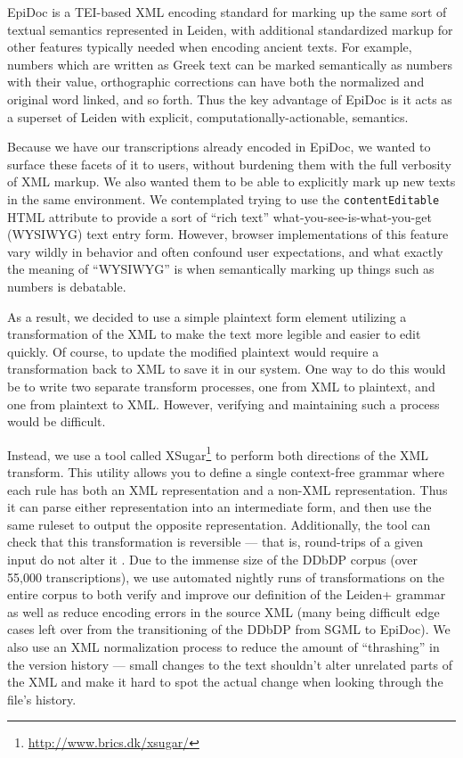 \documentclass[]{article}
\begin{document}
EpiDoc is a TEI-based XML encoding standard for marking up the same sort of textual semantics represented in Leiden, with additional standardized markup for other features typically needed when encoding ancient texts. For example, numbers which are written as Greek text can be marked semantically as numbers with their value, orthographic corrections can have both the normalized and original word linked, and so forth. Thus the key advantage of EpiDoc is it acts as a superset of Leiden with explicit, computationally-actionable, semantics.

Because we have our transcriptions already encoded in EpiDoc, we wanted to surface these facets of it to users, without burdening them with the full verbosity of XML markup. We also wanted them to be able to explicitly mark up new texts in the same environment. We contemplated trying to use the \texttt{contentEditable} HTML attribute to provide a sort of “rich text” what-you-see-is-what-you-get (WYSIWYG) text entry form. However, browser implementations of this feature vary wildly in behavior and often confound user expectations, and what exactly the meaning of “WYSIWYG” is when semantically marking up things such as numbers is debatable.

As a result, we decided to use a simple plaintext form element utilizing a transformation of the XML to make the text more legible and easier to edit quickly. Of course, to update the modified plaintext would require a transformation back to XML to save it in our system. One way to do this would be to write two separate transform processes, one from XML to plaintext, and one from plaintext to XML. However, verifying and maintaining such a process would be difficult.

Instead, we use a tool called XSugar\footnote{\url{http://www.brics.dk/xsugar/}} to perform both directions of the XML transform. This utility allows you to define a single context-free grammar where each rule has both an XML representation and a non-XML representation. Thus it can parse either representation into an intermediate form, and then use the same ruleset to output the opposite representation. Additionally, the tool can check that this transformation is reversible — that is, round-trips of a given input do not alter it \citep{xsugar}. Due to the immense size of the DDbDP corpus (over 55,000 transcriptions), we use automated nightly runs of transformations on the entire corpus to both verify and improve our definition of the Leiden+ grammar as well as reduce encoding errors in the source XML (many being difficult edge cases left over from the transitioning of the DDbDP from SGML to EpiDoc). We also use an XML normalization process to reduce the amount of “thrashing” in the version history — small changes to the text shouldn't alter unrelated parts of the XML and make it hard to spot the actual change when looking through the file's history.
\end{document}
